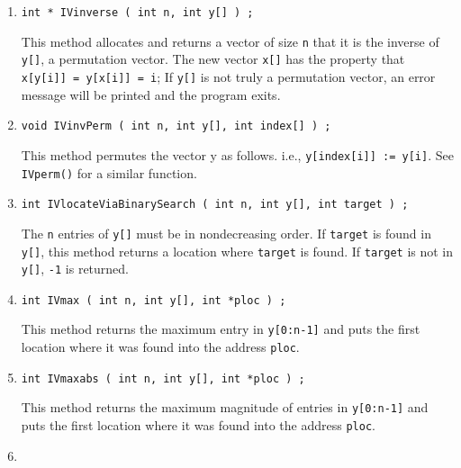 \begin{enumerate}
\item
\begin{verbatim}
int * IVinverse ( int n, int y[] ) ;
\end{verbatim}
This method allocates and returns a vector of size {\tt n}
that it is the inverse of {\tt y[]}, a permutation vector.
The new vector {\tt x[]} has the property that
{\tt x[y[i]] = y[x[i]] = i};
If {\tt y[]} is not truly a permutation vector, an error message
will be printed and the program exits.
\item
\begin{verbatim}
void IVinvPerm ( int n, int y[], int index[] ) ;
\end{verbatim}
This method permutes the vector y as follows.
i.e.,
{\tt y[index[i]] := y[i]}.
See {\tt IVperm()} for a similar function.
\item
\begin{verbatim}
int IVlocateViaBinarySearch ( int n, int y[], int target ) ;
\end{verbatim}
The {\tt n} entries of {\tt y[]} must be in nondecreasing order.
If {\tt target} is found in {\tt y[]},
this method returns a location where {\tt target} is found.
If {\tt target} is not in {\tt y[]}, {\tt -1} is returned.
\item
\begin{verbatim}
int IVmax ( int n, int y[], int *ploc ) ;
\end{verbatim}
This method returns the maximum entry in {\tt y[0:n-1]}
and puts the first location where it was found into the address
{\tt ploc}.
\item
\begin{verbatim}
int IVmaxabs ( int n, int y[], int *ploc ) ;
\end{verbatim}
This method returns the maximum magnitude of entries in 
{\tt y[0:n-1]} and puts the first location where 
it was found into the address {\tt ploc}.
\item

\end{enumerate}
